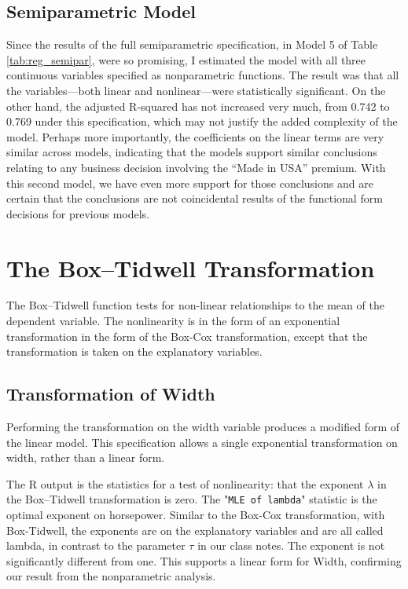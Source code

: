 \pagebreak
\subsection{Semiparametric Model}


Since the results of the full semiparametric specification,
in Model 5 of Table \ref{tab:reg_semipar},
were so promising, 
I estimated the model with all three continuous variables specified as nonparametric functions. 
The result was that 
all the variables---both linear and nonlinear---were 
statistically significant. 
On the other hand, 
the adjusted R-squared has not increased very much, 
from 0.742 to 0.769 under this specification, 
which may not justify the added complexity of the model.
Perhaps more importantly, the coefficients on the 
linear terms are very similar across models, 
indicating that the models support similar conclusions relating to any business decision involving
the ``Made in USA'' premium. 
With this second model, we have even more support for those conclusions
and are certain that the conclusions are not 
coincidental results of the
functional form decisions for previous models.


 



\pagebreak
\section{The Box--Tidwell Transformation}

The Box--Tidwell function tests for non-linear relationships
to the mean of the dependent variable.
The nonlinearity is in the form of an
exponential transformation in the form of the Box-Cox
transformation, except that the transformation is taken
on the explanatory variables.


\subsection{Transformation of Width}


Performing the transformation on the 
width variable
produces a modified form of the linear model.
This specification allows a single exponential
transformation on 
width, 
rather than a linear form.



The \textsf{R} output is the statistics for a test of nonlinearity:
that the exponent $\lambda$ in the Box--Tidwell transformation is zero.
%
The "\texttt{MLE of lambda}" statistic is the optimal exponent on horsepower.
Similar to the Box-Cox transformation,
with Box-Tidwell, the exponents are on the explanatory variables
and are all called lambda, in contrast
to the parameter $\tau$ in our class notes.
%  
The exponent is not significantly different from one. 
This supports a linear form for Width,
confirming our result from the nonparametric analysis.



